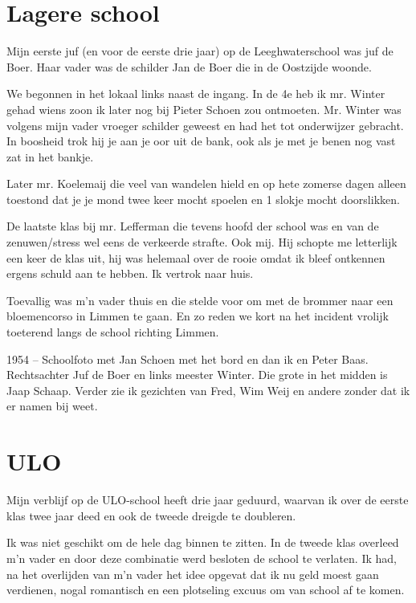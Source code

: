 \documentclass[10pt,twoside,openright]{memoir}
\begin{document}
\chapter{Lagere school} %
\label{cha:lagere_school}

Mijn eerste juf (en voor de eerste drie jaar) op de Leeghwaterschool was juf de Boer. Haar vader was de schilder Jan de Boer die in de Oostzijde woonde. 

We begonnen in het lokaal links naast de ingang. In de 4e heb ik mr. Winter gehad wiens zoon ik later nog bij Pieter Schoen zou ontmoeten. Mr. Winter was volgens mijn vader vroeger schilder geweest en had het tot onderwijzer gebracht. In boosheid trok hij je aan je oor uit de bank, ook als je met je benen nog vast zat in het bankje. 

Later mr. Koelemaij die veel van wandelen hield en op hete zomerse dagen alleen toestond dat je je mond twee keer mocht spoelen en 1 slokje mocht doorslikken. 

De laatste klas bij mr. Lefferman die tevens hoofd der school was en van de zenuwen/stress wel eens de verkeerde strafte. Ook mij. Hij schopte me letterlijk een keer de klas uit, hij was helemaal over de rooie omdat ik bleef ontkennen ergens schuld aan te hebben. Ik vertrok naar huis. 

Toevallig was m’n vader thuis en die stelde voor om met de brommer naar een bloemencorso in Limmen te gaan. En zo reden we kort na het incident vrolijk toeterend langs de school richting Limmen. 

1954 – Schoolfoto met Jan Schoen met het bord en dan ik en Peter Baas. Rechtsachter Juf de Boer en links meester Winter. Die grote in het midden is Jaap Schaap. Verder zie ik gezichten van Fred, Wim Weij en andere zonder dat ik er namen bij weet.

\chapter{ULO} %
\label{cha:ulo}

Mijn verblijf op de ULO-school heeft drie jaar geduurd, waarvan ik over de eerste klas twee jaar deed en ook de tweede dreigde te doubleren. 

Ik was niet geschikt om de hele dag binnen te zitten. In de tweede klas overleed m’n vader en door deze combinatie werd besloten de school te verlaten. Ik had, na het overlijden van m’n vader het idee opgevat dat ik nu geld moest gaan verdienen, nogal romantisch en een plotseling excuus om van school af te komen. 
\end{document}
